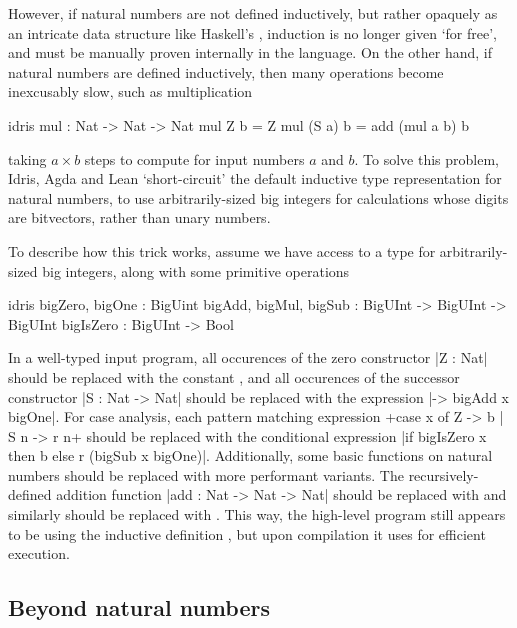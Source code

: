 However, if
natural numbers are not defined inductively, but rather opaquely as an
intricate data structure like Haskell's , induction is no longer
given `for free', and must be manually proven internally in the language. On
the other hand, if natural numbers are defined inductively, then many
operations become inexcusably slow, such as multiplication
\begin{bminted}{idris}
  mul : Nat -> Nat -> Nat
  mul Z b = Z
  mul (S a) b = add (mul a b) b
\end{bminted}
taking $a \times b$ steps to compute for input numbers $a$ and $b$. To solve
this problem, Idris, Agda and Lean `short-circuit' the default inductive type
representation for natural numbers, to use arbitrarily-sized big integers for
calculations whose digits are bitvectors, rather than unary numbers.

To describe how this trick works, assume we have access to a type 
for arbitrarily-sized big integers, along with some primitive operations
\begin{bminted}{idris}
  bigZero, bigOne : BigUint
  bigAdd, bigMul, bigSub : BigUInt -> BigUInt -> BigUInt
  bigIsZero : BigUInt -> Bool
\end{bminted}
In a well-typed input program, all occurences of the zero constructor \idr|Z : Nat|
should be replaced with the constant , and all occurences of the
successor constructor \idr|S : Nat -> Nat| should be replaced with the expression
\idr|\x -> bigAdd x bigOne|. For case analysis, each pattern matching expression
\idr+case x of Z -> b | S n -> r n+ should be replaced with the conditional
expression \idr|if bigIsZero x then b else r (bigSub x bigOne)|. Additionally,
some basic functions on natural numbers should be replaced with more performant
variants. The recursively-defined addition function \idr|add : Nat -> Nat -> Nat|
should be replaced with  and similarly  should be replaced with
.
This way, the high-level program still appears to be using the inductive definition
, but upon compilation it uses  for efficient execution.

\subsection{Beyond natural numbers}

